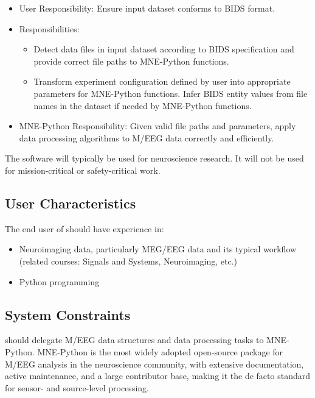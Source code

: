 \documentclass[12pt]{article}
\begin{document}
\begin{itemize}
    \item User Responsibility: Ensure input dataset conforms to BIDS format.
    \item \progname{} Responsibilities:
        \begin{itemize}
            \item Detect data files in input dataset according to BIDS specification and provide correct file paths to MNE-Python functions.
            \item Transform experiment configuration defined by user into appropriate parameters for MNE-Python functions. Infer BIDS entity values from file names in the dataset if needed by MNE-Python functions.
        \end{itemize}
    \item MNE-Python Responsibility: Given valid file paths and parameters, apply data processing algorithms to M/EEG data correctly and efficiently.
\end{itemize}


The software will typically be used for neuroscience research. It will not be used for mission-critical or safety-critical work.




\subsection{User Characteristics} \label{SecUserCharacteristics}


The end user of \progname{} should have experience in:
\begin{itemize}
    \item Neuroimaging data, particularly MEG/EEG data and its typical workflow (related courses: Signals and Systems, Neuroimaging, etc.)
    \item Python programming
\end{itemize}




\subsection{System Constraints}


\progname{} should delegate M/EEG data structures and data processing tasks to MNE-Python. MNE-Python is the most widely adopted open-source package for M/EEG analysis in the neuroscience community, with extensive documentation, active maintenance, and a large contributor base, making it the de facto standard for sensor- and source-level processing.
\end{document}
